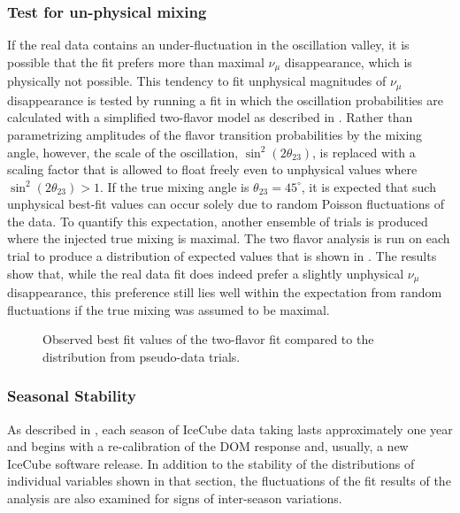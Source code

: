 \subsubsection{Test for un-physical mixing}
If the real data contains an under-fluctuation in the oscillation valley, it is possible that the fit prefers more than maximal $\nu_\mu$ disappearance, which is physically not possible.
This tendency to fit unphysical magnitudes of $\nu_\mu$ disappearance is tested by running a fit in which the oscillation probabilities are calculated with a simplified two-flavor model as described in . Rather than parametrizing amplitudes of the flavor transition probabilities by the mixing angle, however, the scale of the oscillation, $\sin^2(2\theta_{23})$, is replaced with a scaling factor that is allowed to float freely even to unphysical values where $\sin^2(2\theta_{23}) > 1$.
If the true mixing angle is $\theta_{23}=45^\circ$, it is expected that such unphysical best-fit values can occur solely due to random Poisson fluctuations of the data.
To quantify this expectation, another ensemble of trials is produced where the injected true mixing is maximal.
The two flavor analysis is run on each trial to produce a distribution of expected values that is shown in .
The results show that, while the real data fit does indeed prefer a slightly unphysical $\nu_\mu$ disappearance, this preference still lies well within the expectation from random fluctuations if the true mixing was assumed to be maximal.

\begin{figure}
    \centering
    
    \caption{Observed best fit values of the two-flavor fit compared to the distribution from pseudo-data trials.}
    \label{fig:two-flavor-ensemble}
\end{figure}

\subsubsection{Seasonal Stability}
As described in , each season of IceCube data taking lasts approximately one year and begins with a re-calibration of the DOM response and, usually, a new IceCube software release. In addition to the stability of the distributions of individual variables shown in that section, the fluctuations of the fit results of the analysis are also examined for signs of inter-season variations.

